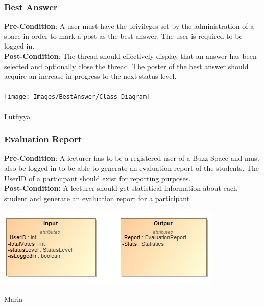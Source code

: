 \documentclass[a4paper,11pt]{article}
\begin{document}
\subsubsection{Best Answer}
\textbf{Pre-Condition}: A user must have the privileges set by the administration of a space in order to mark a post as the best answer. The user is required to be logged in.
\\
\textbf{Post-Condition}: The thread should effectively display that an answer has been selected and optionally close the thread. The poster of the best answer should acquire an increase in progress to the next status level.
\\
\\
\texttt{[image: Images/BestAnswer/Class\_Diagram]}
\\
\\
Lutfiyya\\
\subsubsection{Evaluation Report}
\textbf{Pre-Condition}: A lecturer has to be a registered user of a Buzz Space and must also be logged in to be able to generate an evaluation report of the students. The UserID of a participant should exist for reporting purposes.
\\
\textbf{Post-Condition:} A lecturer should get statistical information about each student and generate an evaluation report for a participant
\\
\\
\includegraphics{Images/Report/Input&Output}
\\
\\
Maria\\
\end{document}
